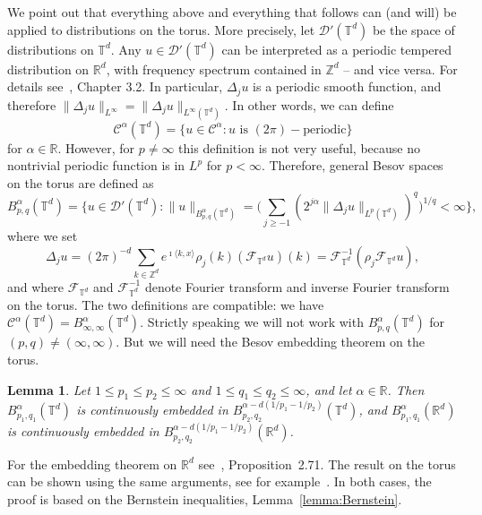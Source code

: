 \documentclass[a4paper,11pt]{article}
\newtheorem{lemma}[theorem]{Lemma}
\theoremstyle{remark}
\newcommand{\R}{\mathbb{R}}
\newcommand{\Z}{\mathbb{Z}}
\newcommand{\CC}{\ensuremath{\mathscr{C}}}
\newcommand{\CD}{\ensuremath{\mathscr{D}}}
\newcommand{\CF}{\ensuremath{\mathscr{F}}}
\begin{document}
We point out that everything above and everything that follows can (and will) be applied to distributions on the torus. More precisely, let $\CD'(\mathbb{T}^{d} )$ be the space of distributions on $\mathbb{T}^{d}$. Any $u \in \CD' (\mathbb{T}^{d} )$ can be interpreted as a periodic tempered distribution on $\mathbb{R}^{d}$, with frequency spectrum contained in $\mathbb{Z}^{d}$ -- and vice versa. For details see~\cite{Schmeisser1987}, Chapter 3.2. In particular, $\Delta_{j} u$ is a periodic smooth function, and therefore $\| \Delta_{j} u\|_{L^{\infty}} = \| \Delta_{j} u\|_{L^{\infty} (\mathbb{T}^{d} )}$. In other words, we can define
\[
    \CC^\alpha(\mathbb{T}^d) = \{ u \in \CC^\alpha: u \text{ is } (2\pi)-\text{periodic}\}
\]
for $\alpha \in \R$. However, for $p \neq \infty$ this definition is not very useful, because no nontrivial periodic function is in $L^p$ for $p < \infty$. Therefore, general Besov spaces on the torus are defined as%
\[
   B^\alpha_{p,q}(\mathbb{T}^d) = \biggl\{ u \in \mathcal{D}' (\mathbb{T}^d) : \lVert u\rVert_{B^{\alpha}_{p, q}(\mathbb{T}^d)} = \biggl( \sum_{j \geqslant - 1} (2^{j \alpha} \lVert \Delta_j u \rVert_{L^p(\mathbb{T}^d)})^q\biggr)^{1/q} < \infty \biggr\},
\]
where we set
\[
   \Delta_j u =  (2\pi)^{-d} \sum_{k \in \Z^d} e^{\imath \langle k, x\rangle} \rho_j(k) (\CF_{\mathbb{T}^d}{u})(k) = \CF_{\mathbb{T}^d}^{-1} (\rho_j \CF_{\mathbb{T}^d}{u}),
\]
and where $\CF_{\mathbb{T}^d}$ and $\CF_{\mathbb{T}^d}^{-1}$ denote Fourier transform and inverse Fourier transform on the torus. The two definitions are compatible: we have $\CC^\alpha(\mathbb{T}^d) = B^\alpha_{\infty, \infty}(\mathbb{T}^d)$. 
Strictly speaking we will not work with $B^\alpha_{p,q}(\mathbb{T}^d)$ for $(p,q) \neq (\infty, \infty)$. But we will need the Besov embedding theorem on the torus.
\begin{lemma}\label{l:besov embedding torus}
   Let $1\leqslant p_1 \leqslant p_2 \leqslant \infty$ and $1\leqslant q_1 \leqslant q_2 \leqslant \infty$, and let $\alpha \in \R$. Then $B^{\alpha}_{p_1,q_1}(\mathbb{T}^d)$ is continuously embedded in $B^{\alpha - d(1/p_1 - 1/p_2)}_{p_2,q_2}(\mathbb{T}^d)$, and $B^{\alpha}_{p_1,q_1}(\mathbb{R}^d)$ is continuously embedded in $B^{\alpha - d(1/p_1 - 1/p_2)}_{p_2,q_2}(\mathbb{R}^d)$.
\end{lemma}
For the embedding theorem on $\R^d$ see~\cite{Bahouri2011}, Proposition~2.71. The result on the torus can be shown using the same arguments, see for example~\cite{Chemin2006}. In both cases, the proof is based on the Bernstein inequalities, Lemma~\ref{lemma:Bernstein}.
\end{document}
